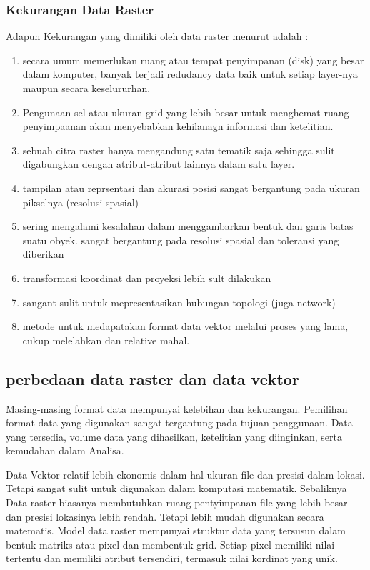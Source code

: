\subsubsection{Kekurangan Data Raster}
Adapun Kekurangan yang dimiliki oleh data raster menurut \cite{irwansyah2013sistem} adalah :
	\begin{enumerate}
		\item secara umum memerlukan ruang atau tempat penyimpanan (disk) yang besar dalam komputer, banyak terjadi redudancy data baik untuk setiap layer-nya maupun secara keselururhan.
		\item Pengunaan sel atau ukuran grid yang lebih besar untuk menghemat ruang penyimpaanan akan menyebabkan kehilanagn informasi dan ketelitian.
		\item sebuah citra raster hanya mengandung satu tematik saja sehingga sulit digabungkan dengan atribut-atribut lainnya dalam satu layer.
		\item tampilan atau reprsentasi dan akurasi posisi sangat bergantung pada ukuran pikselnya (resolusi spasial)
		\item sering mengalami kesalahan dalam menggambarkan bentuk dan garis batas suatu obyek. sangat bergantung pada resolusi spasial dan toleransi yang diberikan
		\item transformasi koordinat dan proyeksi lebih sult dilakukan
		\item sangant sulit untuk mepresentasikan hubungan topologi (juga network)
		\item metode untuk medapatakan format data vektor melalui proses yang lama, cukup melelahkan dan relative mahal.
	\end{enumerate}

\subsection{perbedaan data raster dan data vektor}
Masing-masing format data mempunyai kelebihan dan kekurangan.
Pemilihan format data yang digunakan sangat tergantung pada tujuan penggunaan. 
Data yang tersedia, volume data yang dihasilkan, ketelitian yang diinginkan, serta kemudahan dalam Analisa.

Data Vektor relatif lebih ekonomis dalam hal ukuran file dan presisi dalam lokasi. Tetapi sangat sulit untuk 
digunakan dalam komputasi matematik.
Sebaliknya Data raster biasanya membutuhkan ruang pentyimpanan file yang lebih besar dan presisi lokasinya lebih rendah.
Tetapi lebih mudah digunakan secara matematis.
Model data raster mempunyai struktur data yang tersusun dalam bentuk matriks atau pixel dan membentuk grid. 
Setiap pixel memiliki nilai tertentu dan memiliki atribut tersendiri, termasuk nilai kordinat yang unik.


